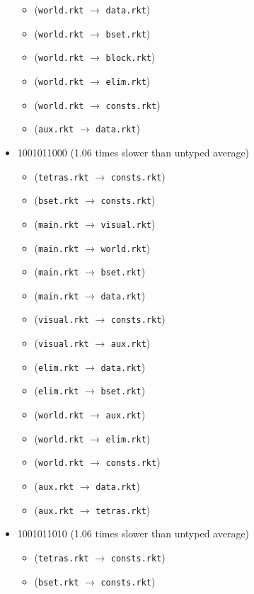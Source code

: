 \documentclass{article}
\newcommand{\mono}[1]{\texttt{#1}}
\begin{document}
\begin{itemize}
\begin{itemize}
  \item (\mono{world.rkt} $\rightarrow$ \mono{data.rkt})
  \item (\mono{world.rkt} $\rightarrow$ \mono{bset.rkt})
  \item (\mono{world.rkt} $\rightarrow$ \mono{block.rkt})
  \item (\mono{world.rkt} $\rightarrow$ \mono{elim.rkt})
  \item (\mono{world.rkt} $\rightarrow$ \mono{consts.rkt})
  \item (\mono{aux.rkt} $\rightarrow$ \mono{data.rkt})
  \end{itemize}
\item 1001011000 (1.06 times slower than untyped average)
  \begin{itemize}
  \item (\mono{tetras.rkt} $\rightarrow$ \mono{consts.rkt})
  \item (\mono{bset.rkt} $\rightarrow$ \mono{consts.rkt})
  \item (\mono{main.rkt} $\rightarrow$ \mono{visual.rkt})
  \item (\mono{main.rkt} $\rightarrow$ \mono{world.rkt})
  \item (\mono{main.rkt} $\rightarrow$ \mono{bset.rkt})
  \item (\mono{main.rkt} $\rightarrow$ \mono{data.rkt})
  \item (\mono{visual.rkt} $\rightarrow$ \mono{consts.rkt})
  \item (\mono{visual.rkt} $\rightarrow$ \mono{aux.rkt})
  \item (\mono{elim.rkt} $\rightarrow$ \mono{data.rkt})
  \item (\mono{elim.rkt} $\rightarrow$ \mono{bset.rkt})
  \item (\mono{world.rkt} $\rightarrow$ \mono{aux.rkt})
  \item (\mono{world.rkt} $\rightarrow$ \mono{elim.rkt})
  \item (\mono{world.rkt} $\rightarrow$ \mono{consts.rkt})
  \item (\mono{aux.rkt} $\rightarrow$ \mono{data.rkt})
  \item (\mono{aux.rkt} $\rightarrow$ \mono{tetras.rkt})
  \end{itemize}
\item 1001011010 (1.06 times slower than untyped average)
  \begin{itemize}
  \item (\mono{tetras.rkt} $\rightarrow$ \mono{consts.rkt})
  \item (\mono{bset.rkt} $\rightarrow$ \mono{consts.rkt})

\end{itemize}
\end{itemize}
\end{document}
